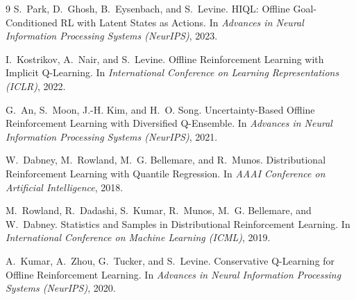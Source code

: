 \documentclass[11pt]{article}
\begin{document}
\begin{thebibliography}{9}
S.~Park, D.~Ghosh, B.~Eysenbach, and S.~Levine.
\newblock HIQL: Offline Goal-Conditioned RL with Latent States as Actions.
\newblock In \emph{Advances in Neural Information Processing Systems (NeurIPS)}, 2023.

I.~Kostrikov, A.~Nair, and S.~Levine.
\newblock Offline Reinforcement Learning with Implicit Q-Learning.
\newblock In \emph{International Conference on Learning Representations (ICLR)}, 2022.

G.~An, S.~Moon, J.-H. Kim, and H.~O. Song.
\newblock Uncertainty-Based Offline Reinforcement Learning with Diversified Q-Ensemble.
\newblock In \emph{Advances in Neural Information Processing Systems (NeurIPS)}, 2021.

W.~Dabney, M.~Rowland, M.~G. Bellemare, and R.~Munos.
\newblock Distributional Reinforcement Learning with Quantile Regression.
\newblock In \emph{AAAI Conference on Artificial Intelligence}, 2018.

M.~Rowland, R.~Dadashi, S.~Kumar, R.~Munos, M.~G. Bellemare, and W.~Dabney.
\newblock Statistics and Samples in Distributional Reinforcement Learning.
\newblock In \emph{International Conference on Machine Learning (ICML)}, 2019.

A.~Kumar, A.~Zhou, G.~Tucker, and S.~Levine.
\newblock Conservative Q-Learning for Offline Reinforcement Learning.
\newblock In \emph{Advances in Neural Information Processing Systems (NeurIPS)}, 2020.
\end{thebibliography}
\end{document}
